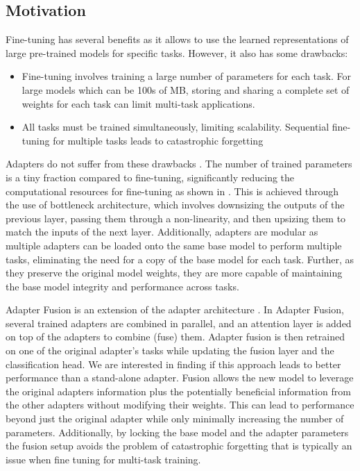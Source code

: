 \documentclass[10pt,twocolumn,letterpaper]{article}
\begin{document}
\subsection{Motivation}  
\label{sec.motivation}
Fine-tuning has several benefits as it allows to use the learned representations of large pre-trained models for specific tasks. However, it also has some drawbacks:

\begin{itemize}
    \item Fine-tuning involves training a large number of parameters for each task. For large models which can be 100s of MB, storing and sharing a complete set of weights for each task can limit multi-task applications.
    \item All tasks must be trained simultaneously, limiting scalability. Sequential fine-tuning for multiple tasks leads to catastrophic forgetting \cite{mccloskey1989catastrophic}
\end{itemize}
Adapters do not suffer from these drawbacks \cite{houlsby2019parameter}. The number of trained parameters is a tiny fraction compared to fine-tuning, significantly reducing the computational resources for fine-tuning as shown in . This is achieved through the use of bottleneck architecture, which involves downsizing the outputs of the previous layer, passing them through a non-linearity, and then upsizing them to match the inputs of the next layer. Additionally, adapters are modular as multiple adapters can be loaded onto the same base model to perform multiple tasks, eliminating the need for a copy of the base model for each task. Further, as they preserve the original model weights, they are more capable of maintaining the base model integrity and performance across tasks.

Adapter Fusion is an extension of the adapter architecture \cite{pfeiffer2020adapterfusion}. In Adapter Fusion, several trained adapters are combined in parallel, and an attention layer is added on top of the adapters to combine (fuse) them. Adapter fusion is then retrained on one of the original adapter’s tasks while updating the fusion layer and the classification head. We are interested in finding if this approach leads to better performance than a stand-alone adapter. Fusion allows the new model to leverage the original adapters information plus the potentially beneficial information from the other adapters without modifying their weights. This can lead to performance beyond just the original adapter while only minimally increasing the number of parameters. Additionally, by locking the base model and the adapter parameters the fusion setup avoids the problem of catastrophic forgetting that is typically an issue when fine tuning for multi-task training.
\end{document}
